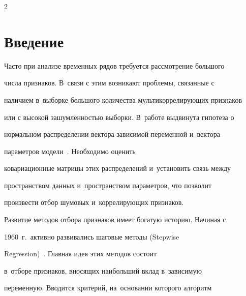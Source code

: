 





      \thispagestyle{headings}



      \begin{multicols}{2}



            \label{st\stat}










\section{Введение}



Часто при анализе временных рядов требуется рассмотрение большого

числа признаков.  В~связи с этим возникают проблемы, связанные с

наличием в~выборке большого количества мультикоррелирующих признаков

или с высокой зашумленностью выборки. В~работе выдвинута  гипотеза о

нормальном распределении вектора зависимой переменной и~вектора

параметров модели~\cite{strijov1, weber}. Необходимо оценить

ковариационные матрицы этих распределений и~установить связь между

пространством данных и~пространством параметров, что позволит

произвести отбор шумовых и~коррелирующих признаков.



Развитие методов отбора признаков имеет богатую историю. Начиная с

1960~г.\ активно развивались шаговые методы (Stepwise

Regression)~\cite{stepwise}. Главная идея этих методов состоит

в~отборе признаков, вносящих наибольший вклад в~зависимую

переменную. Вводится критерий, на~основании которого алгоритм


\end{multicols}

